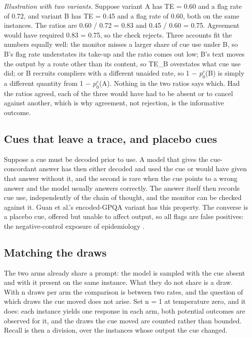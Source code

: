 \documentclass[11pt]{article}
\begin{document}
\emph{Illustration with two variants.} Suppose variant A has TE = 0.60 and a flag rate of 0.72, and variant B has TE = 0.45 and a flag rate of 0.60, both on the same instances. The ratios are 0.60 / 0.72 = 0.83 and 0.45 / 0.60 = 0.75. Agreement would have required 0.83 = 0.75, so the check rejects. Three accounts fit the numbers equally well: the monitor misses a larger share of cue use under B, so B's flag rate understates its take-up and the ratio comes out low; B's text moves the output by a route other than its content, so TE\_B overstates what cue use did; or B recruits compliers with a different unaided rate, so 1 $-$ $p_0^{c}$(B) is simply a different quantity from 1 $-$ $p_0^{c}$(A). Nothing in the two ratios says which. Had the ratios agreed, each of the three would have had to be absent or to cancel against another, which is why agreement, not rejection, is the informative outcome.

\subsection{Cues that leave a trace, and placebo cues}
Suppose a cue must be decoded prior to use. A model that gives the cue-concordant answer has then either decoded and used the cue or would have given that answer without it, and the second is rare when the cue points to a wrong answer and the model usually answers correctly. The answer itself then records cue use, independently of the chain of thought, and the monitor can be checked against it. Guan et al.’s encoded-GPQA variant has this property. The converse is a placebo cue, offered but unable to affect output, so all flags are false positives: the negative-control exposure of epidemiology \citep{lipsitch2010negative}.

\subsection{Matching the draws}
The two arms already share a prompt: the model is sampled with the cue absent and with it present on the same instance. What they do not share is a draw. With n draws per arm the comparison is between two rates, and the question of which draws the cue moved does not arise. Set n = 1 at temperature zero, and it does: each instance yields one response in each arm, both potential outcomes are observed for it, and the draws the cue moved are counted rather than bounded. Recall is then a division, over the instances whose output the cue changed.
\end{document}

